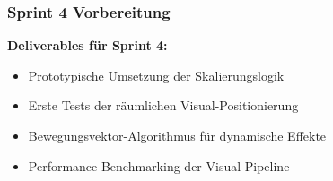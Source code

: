 \subsubsection{Sprint 4 Vorbereitung}

\textbf{Deliverables für Sprint 4:}
\begin{itemize}
    \item Prototypische Umsetzung der Skalierungslogik
    \item Erste Tests der räumlichen Visual-Positionierung
    \item Bewegungsvektor-Algorithmus für dynamische Effekte
    \item Performance-Benchmarking der Visual-Pipeline
\end{itemize}